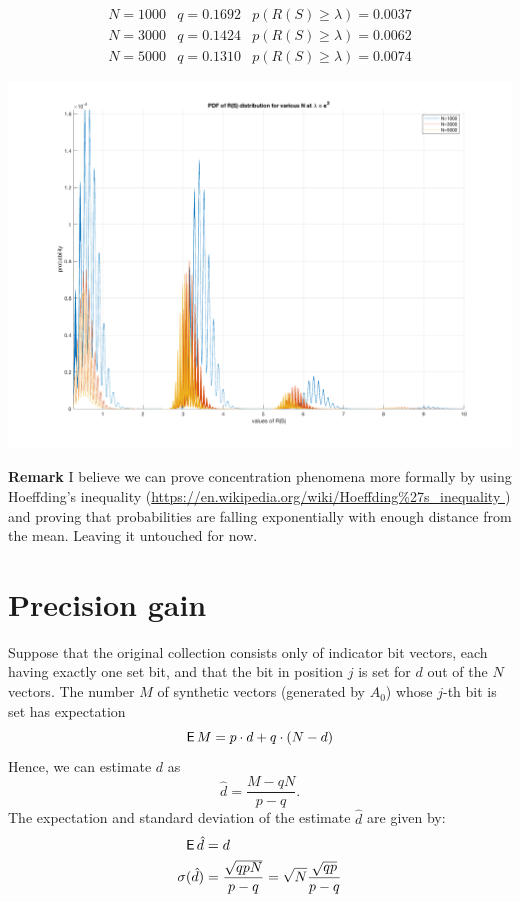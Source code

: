 \documentclass[11pt]{article}
\begin{document}
  \[
  \begin{matrix}N = 1000 & q = 0.1692 & p(R(S) \ge \lambda) = 0.0037 \\
  N= 3000 & q = 0.1424 & p(R(S) \ge \lambda) = 0.0062  \\
  N=5000 & q = 0.1310 & p(R(S) \ge \lambda) = 0.0074 \end{matrix} 
 \]
 
 \includegraphics[scale =  0.25]{nPn5.png}
 
 \textbf{Remark}  I believe we can prove concentration phenomena more formally by using Hoeffding's inequality (\url{https://en.wikipedia.org/wiki/Hoeffding%
}) and proving that probabilities are falling exponentially with enough distance from the mean.  Leaving it untouched for now. 

\section{Precision gain}

Suppose that the original collection consists only of indicator bit vectors, each having exactly one set bit, and that the bit in position $j$ is set for $d$ out of the $N$ vectors.
The number $M$ of synthetic vectors (generated by $A_0$) whose $j$-th bit is set has expectation
\[ \operatorname{\mathsf{E}} M = p \cdot d + q \cdot (N-d) \]
Hence, we can estimate $d$ as
\[ \hat{d} = \frac{M-qN}{p-q}. \]
The expectation and standard deviation of the estimate $\hat{d}$ are given by:
\begin{align*}
\operatorname{\mathsf{E}} \hat{d} &= d \\
\sigma( \hat{d}) &= \frac{\sqrt{qpN}}{p-q} = \sqrt{N} \frac{\sqrt{qp}}{p-q}
\end{align*}
\end{document}
